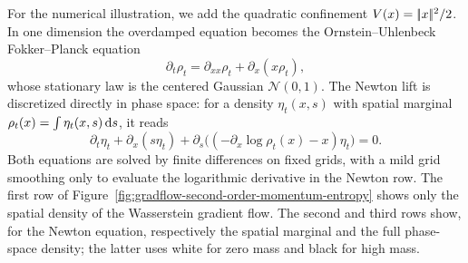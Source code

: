 For the numerical illustration, we add the quadratic confinement $V(x)=|\!| x |\!|^2/2$. In one dimension the overdamped equation becomes the Ornstein--Uhlenbeck Fokker--Planck equation
\[
\partial_t\rho_t=\partial_{xx}\rho_t+\partial_x(x\rho_t),
\]
whose stationary law is the centered Gaussian $\mathcal N(0,1)$. The Newton lift is discretized directly in phase space: for a density $\eta_t(x,s)$ with spatial marginal $\rho_t(x)=\int\eta_t(x,s)\,\mathrm{d} s$, it reads
\[
\partial_t\eta_t+\partial_x(s\eta_t)+\partial_s\bigl((-\partial_x\log\rho_t(x)-x)\eta_t\bigr)=0.
\]
Both equations are solved by finite differences on fixed grids, with a mild grid smoothing only to evaluate the logarithmic derivative in the Newton row. The first row of Figure~\ref{fig:gradflow-second-order-momentum-entropy} shows only the spatial density of the Wasserstein gradient flow. The second and third rows show, for the Newton equation, respectively the spatial marginal and the full phase-space density; the latter uses white for zero mass and black for high mass.

